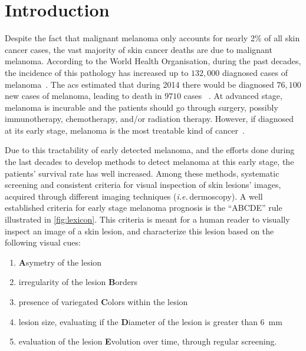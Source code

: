 \graphicspath{ {./content/intro/figures/} }

\section{Introduction}
\label{sec:descr}  %
Despite the fact that malignant melanoma only accounts for nearly 2\% of all skin cancer cases, the vast majority of skin cancer deaths are due to malignant melanoma.
According to the World Health Organisation, during the past decades, the incidence of this pathology has increased up to $132,000$ diagnosed cases of melanoma~\cite{WoH}.
The \Ac{acs} estimated that during 2014 there would be diagnosed $76,100$ new cases of melanoma, leading to death in $9710$ cases  ~\cite{CancerFactsFigures2014}.
At advanced stage, melanoma is incurable and the patients should go through surgery, possibly immunotherapy, chemotherapy, and/or radiation therapy.
However, if diagnosed at its early stage, melanoma is the most treatable kind of cancer~\cite{CancerFactsFigures2014,forsea2012melanoma}.

Due to this tractability of early detected melanoma, and the efforts done during the last decades to develop methods to detect melanoma at this early stage, the patients' survival rate has well increased.
Among these methods, systematic screening and consistent criteria for visual inspection of skin lesions' images, acquired through different imaging techniques (\emph{i.e.}\,dermoscopy).
A well established criteria for early stage melanoma prognosis is the ``ABCDE'' rule~\cite{abbasi2004early} illustrated in \cref{fig:lexicon}.
This criteria is meant for a human reader to visually inspect an image of a skin lesion, and characterize this lesion based on the following visual cues:
\begin{enumerate}[label=(\Alph*)]
\item {\textbf A}symetry of the lesion
\item irregularity of the lesion {\textbf B}orders
\item presence of variegated {\textbf C}olors within the lesion
\item lesion size, evaluating if the {\textbf D}iameter of the lesion is greater than \SI{6}{\milli \meter}
\item evaluation of the lesion {\textbf E}volution over time, through regular screening.
\end{enumerate}

